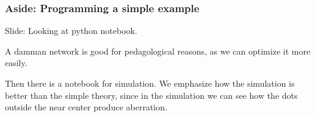 \documentclass[../main/main.tex]{subfiles}
\begin{document}
\subsubsection{Aside: Programming a simple example}

Slide: Looking at python notebook.

A damman network is good for pedagological reasons, as we can optimize it more easily.


Then there is a notebook for simulation. We emphasize how the simulation is better than the simple theory, since in the simulation we can see how the dots outside the near center produce aberration.

\end{document}

